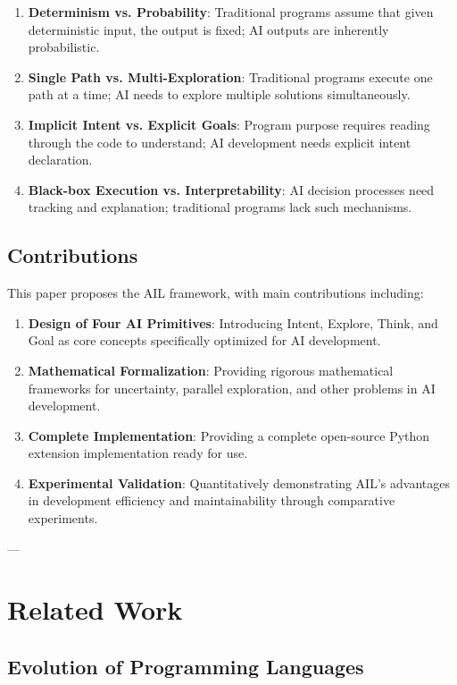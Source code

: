 \documentclass[12pt,a4paper]{article}
\begin{document}
\begin{enumerate}
\item \textbf{Determinism vs. Probability}: Traditional programs assume that given deterministic input, the output is fixed; AI outputs are inherently probabilistic.
\item \textbf{Single Path vs. Multi-Exploration}: Traditional programs execute one path at a time; AI needs to explore multiple solutions simultaneously.
\item \textbf{Implicit Intent vs. Explicit Goals}: Program purpose requires reading through the code to understand; AI development needs explicit intent declaration.
\item \textbf{Black-box Execution vs. Interpretability}: AI decision processes need tracking and explanation; traditional programs lack such mechanisms.
\end{enumerate}

\subsection{Contributions}

This paper proposes the AIL framework, with main contributions including:

\begin{enumerate}
\item \textbf{Design of Four AI Primitives}: Introducing Intent, Explore, Think, and Goal as core concepts specifically optimized for AI development.
\item \textbf{Mathematical Formalization}: Providing rigorous mathematical frameworks for uncertainty, parallel exploration, and other problems in AI development.
\item \textbf{Complete Implementation}: Providing a complete open-source Python extension implementation ready for use.
\item \textbf{Experimental Validation}: Quantitatively demonstrating AIL's advantages in development efficiency and maintainability through comparative experiments.
\end{enumerate}

---

\section{Related Work}

\subsection{Evolution of Programming Languages}
\end{document}
